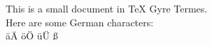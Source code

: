\documentclass{article}
\begin{document}
This is a small document in TeX Gyre Termes.
\\
Here are some German characters:
\\
äÄ öÖ üÜ ß
\end{document}
